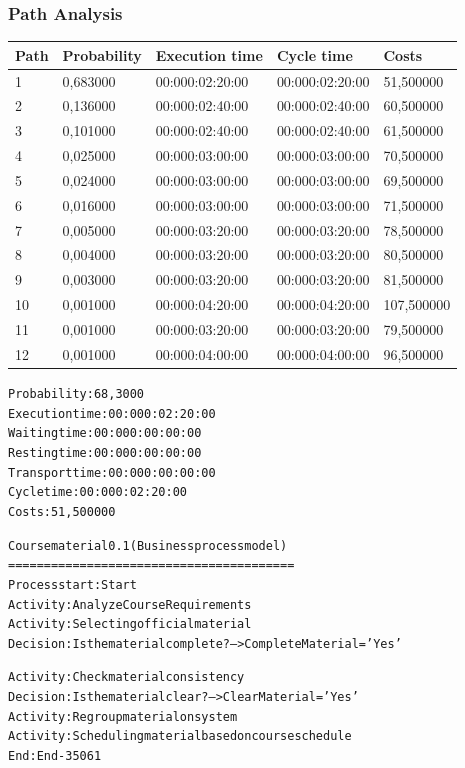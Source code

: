 \subsubsection{Path Analysis}

\begin{table}[ht!]
\centering
\begin{tabular}{|l|l|l|l|l|}
\hline
Path&Probability&Execution time&Cycle time&Costs\\
\hline
1&0,683000&00:000:02:20:00&00:000:02:20:00&51,500000\\
\hline
2&0,136000&00:000:02:40:00&00:000:02:40:00&60,500000\\
\hline
3&0,101000&00:000:02:40:00&00:000:02:40:00&61,500000\\
\hline
4&0,025000&00:000:03:00:00&00:000:03:00:00&70,500000\\
\hline
5&0,024000&00:000:03:00:00&00:000:03:00:00&69,500000\\
\hline
6&0,016000&00:000:03:00:00&00:000:03:00:00&71,500000\\
\hline
7&0,005000&00:000:03:20:00&00:000:03:20:00&78,500000\\
\hline
8&0,004000&00:000:03:20:00&00:000:03:20:00&80,500000\\
\hline
9&0,003000&00:000:03:20:00&00:000:03:20:00&81,500000\\
\hline
10&0,001000&00:000:04:20:00&00:000:04:20:00&107,500000\\
\hline
11&0,001000&00:000:03:20:00&00:000:03:20:00&79,500000\\
\hline
12&0,001000&00:000:04:00:00&00:000:04:00:00&96,500000\\
\hline
\end{tabular}
\end{table}

\begin{alltt}
Probability:   68,3000%
Execution time:  00:000:02:20:00
Waiting time:  00:000:00:00:00
Resting time:  00:000:00:00:00
Transport time:  00:000:00:00:00
Cycle time:  00:000:02:20:00
Costs:  51,500000

Course material 0.1 (Business process model)
========================================
Process start: Start
Activity: Analyze Course Requirements
Activity: Selecting official material
Decision: Is the material complete? --> CompleteMaterial='Yes'

Activity: Check material consistency
Decision: Is the material clear? --> ClearMaterial='Yes'
Activity: Regroup material on system
Activity: Scheduling material based on course schedule
End: End-35061
\end{alltt}

